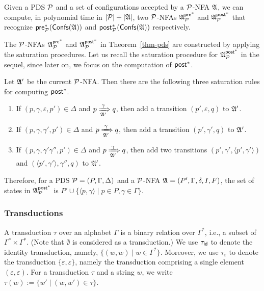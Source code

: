 \begin{theorem}\label{thm-pds}
	Given  a PDS ${\mathcal{P} }$ and a set of configurations accepted by a ${\mathcal{P} }$-NFA ${\mathfrak{A} }$, we can compute, in polynomial time in $|{\mathcal{P} }|+|{\mathfrak{A} }|$, two ${\mathcal{P} }$-NFAs ${\mathfrak{A} }^{{\mathsf{pre} }^*}_{{\mathcal{P} }}$  and ${\mathfrak{A} }^{{\mathsf{post} }^*}_{{\mathcal{P} }}$ that recognize ${\mathsf{pre} }^*_{\mathcal{P} }({\mathsf{Confs} }({\mathfrak{A} }))$ and ${\mathsf{post} }^*_{\mathcal{P} }({\mathsf{Confs} }({\mathfrak{A} }))$ respectively.
\end{theorem}

The ${\mathcal{P} }$-NFAs ${\mathfrak{A} }^{{\mathsf{pre} }^*}_{{\mathcal{P} }}$ and ${\mathfrak{A} }^{{\mathsf{post} }^*}_{{\mathcal{P} }}$ in Theorem~\ref{thm-pds} are constructed by applying the saturation procedures. Let us recall the saturation procedure for ${\mathfrak{A} }^{{\mathsf{post} }^*}_{{\mathcal{P} }}$ in the sequel, since later on, we focus on the computation of ${\mathsf{post} }^*$.

Let ${\mathfrak{A} }'$ be the current ${\mathcal{P} }$-NFA. Then there are the following three saturation rules for computing ${\mathsf{post} }^*$. 

\smallskip
\fbox
{
\begin{minipage}{0.9\textwidth}
\begin{enumerate}
    \item If $(p, \gamma, \varepsilon, p') \in \Delta$ and $p \xRightarrow[{\mathfrak{A} }']{\gamma} q$, then add a transition $(p', \varepsilon, q)$ to ${\mathfrak{A} }'$. 
%
    \item If $(p, \gamma, \gamma', p') \in \Delta$ and $p \xRightarrow[{\mathfrak{A} }']{\gamma} q$, then add a transition $(p', \gamma', q)$ to ${\mathfrak{A} }'$. 
%
    \item If $(p, \gamma, \gamma' \gamma'', p') \in \Delta$ and $p \xRightarrow[{\mathfrak{A} }']{\gamma } q$, then add two transitions $(p', \gamma', \langle p', \gamma'\rangle)$ and $(\langle p', \gamma' \rangle, \gamma'', q)$ to ${\mathfrak{A} }'$.     
\end{enumerate}
\end{minipage}
}

\smallskip

Therefore, for a PDS ${\mathcal{P} }=(P,\Gamma,\Delta)$ and a ${\mathcal{P} }$-NFA ${\mathfrak{A} } = (P', \Gamma, \delta, I, F)$, the set of states in ${\mathfrak{A} }^{{\mathsf{post} }^*}_{\mathcal{P} }$ is $P' \cup \{\langle p, \gamma \rangle \mid p \in P, \gamma \in \Gamma \}$.


\subsubsection{Transductions}
A transduction $\tau$ over an alphabet $\Gamma$ is a binary relation over $\Gamma^*$, i.e., a subset of $\Gamma^* \times \Gamma^*$. (Note that $\emptyset$ is considered as a transduction.)
We use $\tau_{\mathsf{id}}$ to denote the identity transduction, namely,  $\{(w,w) \mid w \in \Gamma^*\}$. 
Moreover, we use $\tau_\varepsilon$ to denote the transduction $\{\varepsilon, \varepsilon\}$, namely the transduction comprising a single element $(\varepsilon, \varepsilon)$.
For a transduction $\tau$ and a string $w$, we write $\tau(w):= \{w' \mid (w, w') \in \tau \}$.

